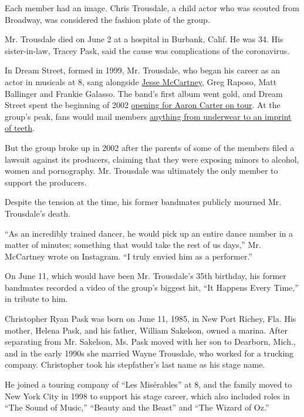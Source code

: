 Each member had an image. Chris Trousdale, a child actor who was scouted
from Broadway, was considered the fashion plate of the group.

Mr. Trousdale died on June 2 at a hospital in Burbank, Calif. He was 34.
His sister-in-law, Tracey Pask, said the cause was complications of the
coronavirus.

In Dream Street, formed in 1999, Mr. Trousdale, who began his career as
an actor in musicals at 8, sang alongside
\href{https://www.nytimes3xbfgragh.onion/2009/03/22/fashion/22night.html?searchResultPosition=1}{Jesse
McCartney}, Greg Raposo, Matt Ballinger and Frankie Galasso. The band's
first album went gold, and Dream Street spent the beginning of 2002
\href{https://idobi.com/news/dream-street-hits-the-road-with-aaron-carter-in-2002/}{opening
for Aaron Carter on tour}. At the group's peak, fans would mail members
\href{https://www.nytimes3xbfgragh.onion/2002/12/08/magazine/the-way-we-live-now-12-8-02-kids-after-they-were-stars.html}{anything
from underwear to an imprint of teeth}.

But the group broke up in 2002 after the parents of some of the members
filed a lawsuit against its producers, claiming that they were exposing
minors to alcohol, women and pornography. Mr. Trousdale was ultimately
the only member to support the producers.

Despite the tension at the time, his former bandmates publicly mourned
Mr. Trousdale's death.

``As an incredibly trained dancer, he would pick up an entire dance
number in a matter of minutes; something that would take the rest of us
days,'' Mr. McCartney wrote on Instagram. ``I truly envied him as a
performer.''

On June 11, which would have been Mr. Trousdale's 35th birthday, his
former bandmates recorded a video of the group's biggest hit, ``It
Happens Every Time,'' in tribute to him.

Christopher Ryan Pask was born on June 11, 1985, in New Port Richey,
Fla. His mother, Helena Pask, and his father, William Sakelson, owned a
marina. After separating from Mr. Sakelson, Ms. Pask moved with her son
to Dearborn, Mich., and in the early 1990s she married Wayne Trousdale,
who worked for a trucking company. Christopher took his stepfather's
last name as his stage name.

He joined a touring company of ``Les Misérables'' at 8, and the family
moved to New York City in 1998 to support his stage career, which also
included roles in ``The Sound of Music,'' ``Beauty and the Beast'' and
``The Wizard of Oz.''

